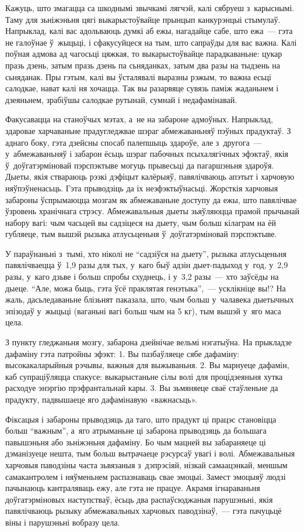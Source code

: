 Кажуць, што змагацца са шкоднымі звычкамі лягчэй, калі сябруеш з~карыснымі. Таму для зьніжэньня цягі выкарыстоўвайце прынцып канкурэнцыі стымулаў. Напрыклад, калі вас адольваюць думкі аб ежы, нагадайце сабе, што ежа~--- гэта не галоўнае ў~жыцьці, і сфакусуйцеся на тым, што сапраўды для вас важна. Калі поўная адмова ад чагосьці цяжкая, то выкарыстоўвайце парадкаваньне: цукар празь дзень, затым празь дзень па сьняданках, затым два разы на тыдзень на сьняданак. Пры гэтым, калі вы ўсталявалі выразны рэжым, то важна есьці салодкае, нават калі ня хочацца. Так вы разарвяце сувязь паміж жаданьнем і дзеяньнем, зрабіўшы салодкае рутынай, сумнай і недафамінавай.

Факусавацца на станоўчых мэтах, а~не на забароне адмоўных. Напрыклад, здаровае харчаваньне прадугледжвае шэраг абмежаваньняў пэўных прадуктаў. З аднаго боку, гэта дзейсны спосаб палепшыць здароўе, але з~другога~--- у~абмежаваньняў і забарон ёсьць шэраг пабочных псыхалягічных эфэктаў, якія ў~доўгатэрміновай пэрспэктыве могуць прывесьці да пагаршэньня здароўя. Дыеты, якія ствараюць рэзкі дэфіцыт калёрыяў, павялічваюць апэтыт і харчовую няўпэўненасьць. Гэта прыводзіць да іх неэфэктыўнасьці. Жорсткія харчовыя забароны ўспрымаюцца мозгам як абмежаваньне доступу да ежы, што павялічвае ўзровень хранічнага стрэсу. Абмежавальныя дыеты зьяўляюцца прамой прычынай набору вагі: чым часьцей вы садзіцеся на дыету, чым больш кілаграм на ёй губляеце, тым вышэй рызыка атлусьценьня ў~доўгатэрміновай пэрспэктыве.

У параўнаньні з~тымі, хто ніколі не ``садзіўся на дыету'', рызыка атлусьценьня павялічваецца ў~1,9 разы для тых, у~каго быў адзін дыет-падыход у~год, у~2,9 разы, у~каго дзьве і больш спробы схуднець, і у~3,2 разы~--- хто заўсёды на дыеце. ``Але, можа быць, гэта ўсё праклятая генэтыка'',~--- усклікніце вы!? На жаль, дасьледаваньне блізьнят паказала, што, чым больш у~чалавека дыетычных эпізодаў у~жыцьці (ваганьні вагі больш чым на 5 кг), тым вышэй у~яго маса цела.

З пункту гледжаньня мозгу, забарона дзейнічае вельмі нэгатыўна. На прыкладзе дафаміну гэта патройны эфэкт: 1. Вы пазбаўляеце сябе дафаміну: высокакаларыйныя рэчывы, важныя для выжываньня. 2. Вы марнуеце дафамін, каб супраціўляцца спакусе: выкарыстаньне сілы волі для процідзеяньня хутка расходуе энэргію прэфрантальнай кары. 3. Вы зьмяняеце сваё стаўленьне да прадукту, падвышаеце яго дафамінавую «важнасьць».

Фіксацыя і забароны прыводзяць да таго, што прадукт ці працэс становіцца больш ``важным'', а~яго атрыманьне ці забарона прыводзяць да большага павышэньня або зьніжэньня дафаміну. Бо чым мацней вы забараняеце ці дэманізуеце нешта, тым больш вытрачаеце рэсурсаў увагі і волі. Абмежавальныя харчовыя паводзіны часта зьвязаныя з~дэпрэсіяй, нізкай самаацэнкай, меншым самакантролем і няўменьнем распазнаваць свае эмоцыі. Замест эмоцыяў людзі пачынаюць кантраляваць ежу, але гэта не працуе. Акрамя ігнараваньня доўгатэрміновых наступстваў, ёсьць два распаўсюджаныя парушэньні, якія павялічваюць рызыку абмежавальных харчовых паводзінаў,~--- гэта пачуцьцё віны і парушэньні вобразу цела.

